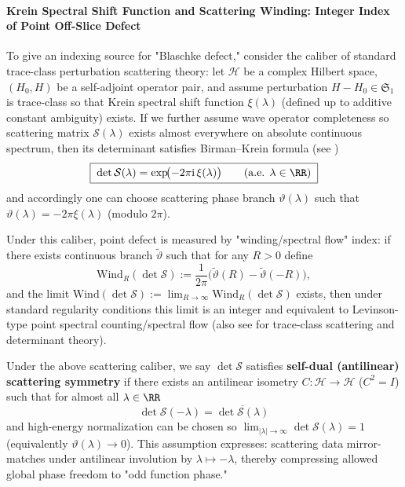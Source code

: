\paragraph{Krein Spectral Shift Function and Scattering Winding: Integer Index of Point Off-Slice Defect}\label{par:selfdual-krein-wind}

To give an indexing source for "Blaschke defect," consider the caliber of standard trace-class perturbation scattering theory: let \(\mathcal H\) be a complex Hilbert space, \((H_0,H)\) be a self-adjoint operator pair, and assume perturbation \(H-H_0\in\mathfrak S_1\) is trace-class so that Krein spectral shift function \(\xi(\lambda)\) (defined up to additive constant ambiguity) exists. If we further assume wave operator completeness so scattering matrix \(\mathcal S(\lambda)\) exists almost everywhere on absolute continuous spectrum, then its determinant satisfies Birman–Krein formula (see \cite{Simon2005TraceIdeals,Yafaev1992ScatteringGeneralTheory})
\begin{equation}\label{eq:birman-krein-detS-ssf}
\boxed{\;\det\mathcal S(\lambda)=\exp\!\bigl(-2\pi\mathrm{i}\,\xi(\lambda)\bigr)\qquad(\text{a.e. }\lambda\in\RR)\;}
\end{equation}
and accordingly one can choose scattering phase branch \(\vartheta(\lambda)\) such that
\(\vartheta(\lambda)=-2\pi\xi(\lambda)\) (modulo \(2\pi\)).
\par
Under this caliber, point defect is measured by "winding/spectral flow" index: if there exists continuous branch \(\widetilde\vartheta\) such that for any \(R>0\) define
\begin{equation}\label{eq:scattering-wind-def}
\mathrm{Wind}_R(\det\mathcal S)
:=\frac{1}{2\pi}\bigl(\widetilde\vartheta(R)-\widetilde\vartheta(-R)\bigr),
\end{equation}
and the limit \(\mathrm{Wind}(\det\mathcal S):=\lim_{R\to\infty}\mathrm{Wind}_R(\det\mathcal S)\) exists, then under standard regularity conditions this limit is an integer and equivalent to Levinson-type point spectral counting/spectral flow (also see \cite{Yafaev1992ScatteringGeneralTheory,Simon2005TraceIdeals} for trace-class scattering and determinant theory).

\begin{definition}\label{def:selfdual-scattering-symmetry-ssf}
Under the above scattering caliber, we say \(\det\mathcal S\) satisfies \textbf{self-dual (antilinear) scattering symmetry} if there exists an antilinear isometry \(C:\mathcal H\to\mathcal H\) (\(C^2=I\)) such that for almost all \(\lambda\in\RR\)
\begin{equation}\label{eq:selfdual-scattering-det-sym}
\boxed{\;\det\mathcal S(-\lambda)=\overline{\det\mathcal S(\lambda)}\;}
\end{equation}
and high-energy normalization can be chosen so \(\lim_{|\lambda|\to\infty}\det\mathcal S(\lambda)=1\) (equivalently \(\vartheta(\lambda)\to 0\)).
This assumption expresses: scattering data mirror-matches under antilinear involution by \(\lambda\mapsto-\lambda\), thereby compressing allowed global phase freedom to "odd function phase."
\end{definition}

